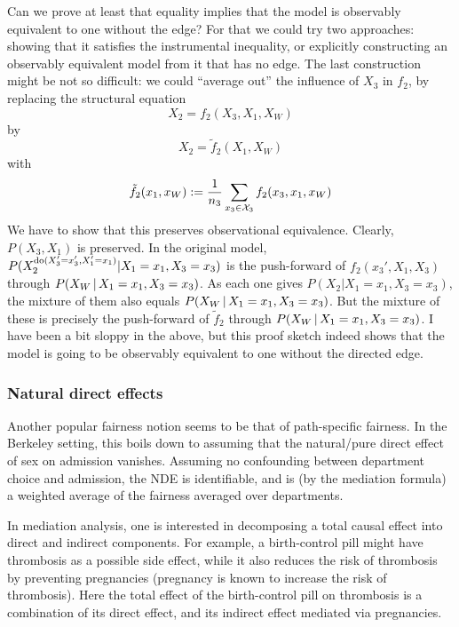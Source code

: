 Can we prove at least that equality implies that the model is observably equivalent to one without the edge?
For that we could try two approaches: showing that it satisfies the instrumental inequality, or explicitly constructing
an observably equivalent model from it that has no edge. The last construction might be not so difficult: we could
``average out'' the influence of $X_3$ in $f_2$, by replacing the structural equation
$$X_2 = f_2(X_3,X_1,X_W)$$
by
$$X_2 = \tilde{f}_2(X_1,X_W)$$
with
$$\tilde{f}_2(x_1,x_W) := \frac{1}{n_3} \sum_{x_3 \in \mathcal{X}_3} f_2(x_3,x_1,x_W)$$
We have to show that this preserves observational equivalence. Clearly, $P(X_3,X_1)$ is preserved.
In the original model, $P(X_2^{\operatorname{do}(X_3'=x_3',X_1'=x_1)} | X_1=x_1,X_3=x_3)$ is the push-forward
of $f_2(x_3',X_1,X_3)$ through $P(X_W \operatorname*{|} X_1=x_1,X_3=x_3)$.
As each one gives $P(X_2|X_1=x_1,X_3=x_3)$, the mixture of them also equals $P(X_W \operatorname*{|} X_1=x_1,X_3=x_3)$.
But the mixture of these is precisely the push-forward of $\tilde{f}_2$ through $P(X_W \operatorname*{|} X_1=x_1,X_3=x_3)$.
I have been a bit sloppy in the above, but this proof sketch indeed shows that the model is going to be 
observably equivalent to one without the directed edge.

\subsubsection{Natural direct effects}

Another popular fairness notion seems to be that of path-specific fairness.
In the Berkeley setting, this boils down to assuming that the natural/pure direct effect of sex on admission vanishes.
Assuming no confounding between department choice and admission, the NDE is identifiable, and is (by the mediation formula) a weighted average of the fairness averaged over departments. 

In mediation analysis, one is interested in decomposing a total causal effect into direct and indirect components. 
For example, a birth-control pill might have thrombosis as a possible side effect, while it also reduces the risk of thrombosis by preventing pregnancies (pregnancy is known to increase the risk of thrombosis).
Here the total effect of the birth-control pill on thrombosis is a combination of its direct effect, and its indirect effect mediated via pregnancies.

